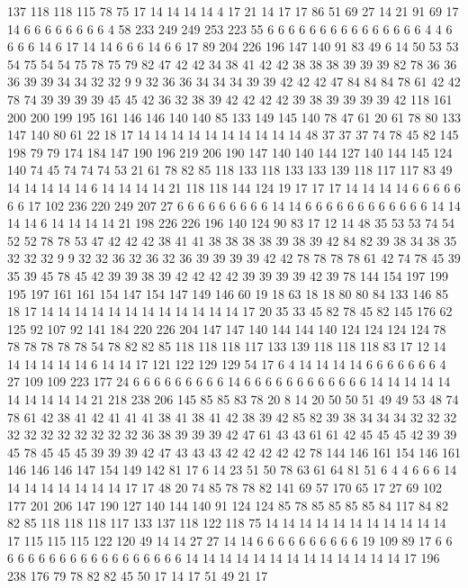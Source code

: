 137 118 118 115 78 75 17 14 14 14 14 4 17 21 14 17 17 86 51 69
27 14 21 91 69 17 14 6 6 6 6 6 6 6 6 4 58 233 249 249
253 223 55 6 6 6 6 6 6 6 6 6 6 6 6 6 6 6 4 4
6 6 6 6 14 6 17 14 14 6 6 6 14 6 6 17 89 204 226 196
147 140 91 83 49 6 14 50 53 53 54 75 54 54 75 78 75 79 82 47
42 42 34 38 41 42 42 38 38 38 39 39 39 82 78 36 36 36 39 39
34 34 32 32 9 9 32 36 36 34 34 34 39 39 42 42 42 47 84 84
84 78 61 42 42 78 74 39 39 39 39 45 45 42 36 32 38 39 42 42
42 42 39 38 39 39 39 39 42 118 161 200 200 199 195 161 146 146 140 140
85 133 149 145 140 78 47 61 20 61 78 80 133 147 140 80 61 22 18 17
14 14 14 14 14 14 14 14 14 14 48 37 37 37 74 78 45 82 145 198
79 79 174 184 147 190 196 219 206 190 147 140 140 144 127 140 144 145 124 140
74 45 74 74 74 53 21 61 78 82 85 118 133 118 133 133 139 118 117 117
83 49 14 14 14 14 14 6 14 14 14 14 21 118 118 144 124 19 17 17
17 14 14 14 14 6 6 6 6 6 6 6 17 102 236 220 249 207 27 6
6 6 6 6 6 6 6 6 14 14 6 6 6 6 6 6 6 6 6 6
6 6 14 14 14 14 6 14 14 14 14 21 198 226 226 196 140 124 90 83
17 12 14 48 35 53 53 74 54 52 52 78 78 53 47 42 42 42 38 41
41 38 38 38 38 39 38 39 42 84 82 39 38 34 38 35 32 32 32 9
9 32 32 36 32 36 32 36 39 39 39 39 42 42 78 78 78 78 61 42
74 78 45 39 35 39 45 78 45 42 39 39 38 39 42 42 42 42 39 39
39 39 42 39 78 144 154 197 199 195 197 161 161 154 147 154 147 149 146 60
19 18 63 18 18 80 80 84 133 146 85 18 17 14 14 14 14 14 14 14
14 14 14 14 14 17 20 35 33 45 82 78 45 82 145 176 62 125 92 107
92 141 184 220 226 204 147 147 140 144 144 140 124 124 124 124 78 78 78 78
78 78 54 78 82 82 85 118 118 118 117 133 139 118 118 118 83 17 12 14
14 14 14 14 14 6 14 14 17 121 122 129 129 54 17 6 4 14 14 14
14 6 6 6 6 6 6 6 4 27 109 109 223 177 24 6 6 6 6 6
6 6 6 6 14 6 6 6 6 6 6 6 6 6 6 6 6 14 14 14
14 14 14 14 14 14 14 21 218 238 206 145 85 85 83 78 20 8 14 20
50 50 51 49 49 53 48 74 78 61 42 38 41 42 41 41 41 38 41 38
41 42 38 39 42 85 82 39 38 34 34 34 32 32 32 32 32 32 32 32
32 32 32 36 38 39 39 39 42 47 61 43 43 61 61 42 45 45 45 42
39 39 45 78 45 45 45 39 39 39 42 47 43 43 43 42 42 42 42 42
78 144 146 161 154 146 161 146 146 146 147 154 149 142 81 17 6 14 23 51
50 78 63 61 64 81 51 6 4 4 6 6 6 14 14 14 14 14 14 14
14 17 17 48 20 74 85 78 78 82 141 69 57 170 65 17 27 69 102 177
201 206 147 190 127 140 144 140 91 124 124 85 78 85 85 85 85 84 117 84
82 82 85 118 118 118 117 133 137 118 122 118 75 14 14 14 14 14 14 14
14 14 14 14 17 115 115 115 122 120 49 14 14 27 27 14 14 6 6 6
6 6 6 6 6 6 6 19 109 89 17 6 6 6 6 6 6 6 6 6
6 6 6 6 6 6 6 6 6 6 14 14 14 14 14 14 14 14 14 14
14 14 14 17 196 238 176 79 78 82 82 45 50 17 14 17 51 49 21 17
